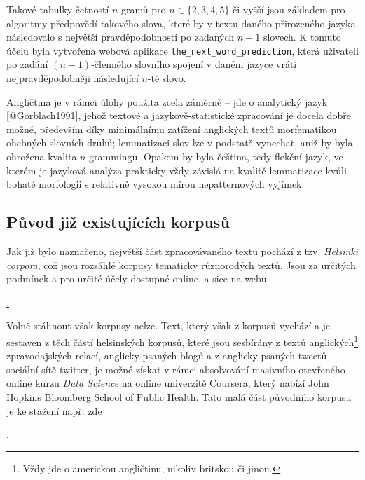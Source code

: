 Takové tabulky četností $n$-gramů pro $n \in \{2, 3, 4, 5\}$ či vyšší
jsou základem pro algoritmy předpovědí takového slova, které by v textu
daného přirozeného jazyka následovalo s největší pravděpodobností po
zadaných $n - 1$ slovech. K tomuto účelu byla vytvořena webová aplikace
\texttt{the\_next\_word\_prediction}, která uživateli po zadání
$(n - 1)$-členného slovního spojení v daném jazyce vrátí
nejpravděpodobněji následující $n$-té slovo.

Angličtina je v rámci úlohy použita zcela záměrně -- jde o analytický
jazyk [@Gorblach1991], jehož textové a jazykově-statistické zpracování
je docela dobře možné, především díky minimálnímu zatížení anglických
textů morfematikou ohebných slovních druhů; lemmatizaci slov lze
v podstatě vynechat, aniž by byla ohrožena kvalita $n$-grammingu.
Opakem by byla čeština, tedy flekční jazyk, ve kterém je jazyková
analýza prakticky vždy závislá na kvalitě lemmatizace kvůli bohaté
morfologii s relativně vysokou mírou nepatternových vyjímek.


\subsection{Původ již existujících korpusů}

Jak již bylo naznačeno, největší část zpracovávaného textu pochází z tzv. \textit{Helsinki corpora}, což jsou rozsáhlé korpusy tematicky různorodých textů. Jsou za určitých podmínek a pro určité účely dostupné online, a sice na webu

\begin{center}
\href{http://www.helsinki.fi/varieng/CoRD/corpora/HelsinkiCorpus/}{.}
\end{center}

Volně stáhnout však korpusy nelze. Text, který však z korpusů vychází a je sestaven z těch částí helsinských korpusů, které jsou sesbírány z textů anglických\footnote{Vždy jde o americkou angličtinu, nikoliv britskou či jinou.} zpravodajských relací, anglicky psaných blogů a z anglicky psaných tweetů sociální sítě \textsf{twitter}, je možné získat v rámci absolvování masivního otevřeného online kurzu \href{https://www.coursera.org/specializations/jhu-data-science/}{\textit{Data Science}} na online univerzitě Coursera\textsuperscript{\textregistered}, který nabízí John Hopkins Bloomberg School of Public Health. Tato malá část původního korpusu je ke stažení např. zde

\begin{center}
\href{https://d396qusza40orc.cloudfront.net/dsscapstone/dataset/Coursera-SwiftKey.zip}{.}
\end{center}

